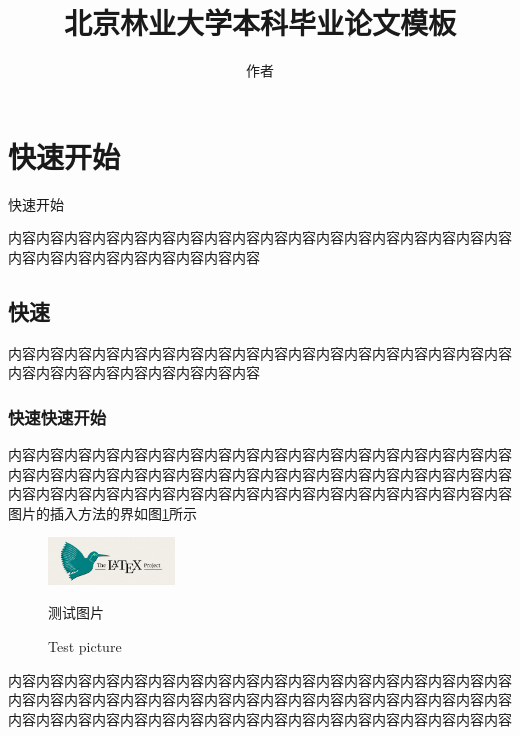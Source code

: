 \documentclass{bjfu}
\title{北京林业大学本科毕业论文模板}
\author{作者}
\begin{document}
\makeBjfuTitlePage
\section{快速开始}
快速开始 \cite{刘海洋2013LATEX}

内容内容内容内容内容内容内容内容内容内容内容内容内容内容内容内容内容内容内容内容内容内容内容内容内容内容内容

\subsection{快速}

内容内容内容内容内容内容内容内容内容内容内容内容内容内容内容内容内容内容内容内容内容内容内容内容内容内容内容

\subsubsection{快速快速开始}

内容内容内容内容内容内容内容内容内容内容内容内容内容内容内容内容内容内容内容内容内容内容内容内容内容内容内容内容内容内容内容内容内容内容内容内容内容内容内容内容内容内容内容内容内容内容内容内容内容内容内容内容内容内容
图片的插入方法的界如图\ref{Fig:test}所示
\begin{figure}[htbp] %
    \centering %
    \includegraphics[width=0.3\textwidth]{images/test.png} %

    \renewcommand{\figurename}{图}
    \caption{测试图片} %
    \addtocounter{figure}{-1}
    \vspace{-5pt}
    \renewcommand{\figurename}{Fig}
    \caption{Test picture} %
    \label{Fig:test} %
\end{figure}

内容内容内容内容内容内容内容内容内容内容内容内容内容内容内容内容内容内容内容内容内容内容内容内容内容内容内容内容内容内容内容内容内容内容内容内容内容内容内容内容内容内容内容内容内容内容内容内容内容内容内容内容内容内容
\end{document}
